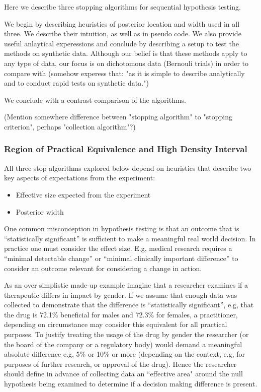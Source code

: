 Here we describe three stopping algorithms for sequential hypothesis testing.

We begin by describing heuristics of posterior location and width used in all three.
We describe their intuition, as well as in pseudo code.
We also provide useful anlaytical experessions and conclude by describing a setup
to test the methods on synthetic data.
Although our belief is that these methods apply to any type of data,
our focus is on dichotomous data (Bernouli trials)
in order to compare with \cite{kruschke2015doing}
(somehow experess that: "as it is simple to describe analytically and
to conduct rapid tests on synthetic data.")


We conclude with a contrast comparison of the algorithms.

(Mention somewhere difference between "stopping algorithm" to "stopping criterion",
perhaps "collection algorithm"?)


\subsubsection{Region of Practical Equivalence and High Density Interval}
All three stop algorithms explored below depend on heuristics that describe two key
aspects of expectations from the experiment:
\begin{itemize}
    \item Effective size expected from the experiment
    \item Posterior width
\end{itemize}


One common misconception in hypothesis testing is that an outcome that is
“statistically significant” is sufficient to make a meaningful real world decision.
In practice one must consider the effect size.
E.g, medical research requires a “minimal detectable change” or
“minimal clinically important difference” to consider an outcome relevant for
considering a change in action.

As an over simplistic made-up example imagine that a researcher examines if a
therapeutic differs in impact by gender.
If we assume that enough data was collected to demonstrate that the difference is
“statistically significant”, e.g, that the drug is 72.1\% beneficial for males
and 72.3\% for females, a practitioner, depending on circumstance may consider
this equivalent for all practical purposes.
To justify treating the usage of the drug by gender the
researcher (or the board of the company or a regulatory body) would demand
a meaningful absolute difference e.g,  5\% or 10\% or more
(depending on the context, e.g, for purposes of further research, or approval
of the drug). Hence the researcher should define in advance of collecting data an
“effective area" around the null hypothesis being examined to determine if a
decision making difference is present.

